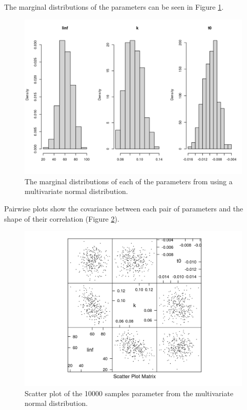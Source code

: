 \documentclass[
]{book}
\begin{document}
The marginal distributions of the parameters can be seen in Figure \ref{fig:plotnormparams}.

\begin{figure}
\centering
\includegraphics{_bookdown_files/_main_files/figure-html/plotnormparams-1.png}
\caption{\label{fig:plotnormparams}The marginal distributions of each of the parameters from using a multivariate normal distribution.}
\end{figure}

Pairwise plots show the covariance between each pair of parameters and the shape of their correlation (Figure \ref{fig:plotnormscatter}).

\begin{figure}
\centering
\includegraphics{_bookdown_files/_main_files/figure-html/plotnormscatter-1.png}
\caption{\label{fig:plotnormscatter}Scatter plot of the 10000 samples parameter from the multivariate normal distribution.}
\end{figure}
\end{document}
